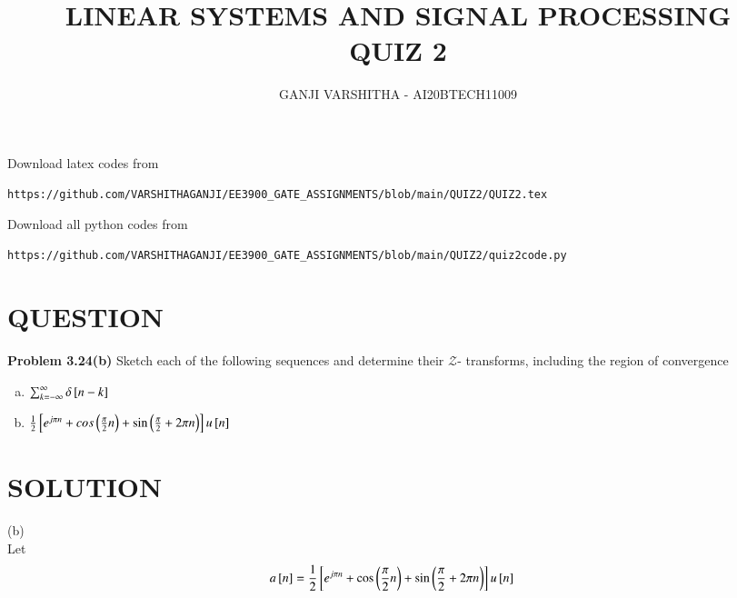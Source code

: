 \documentclass[journal,12pt,twocolumn]{IEEEtran}
\begin{document}
\let\vec\mathbf
\renewcommand{\thefigure}{\theproblem}
\def\putbox#1#2#3{\makebox[0in][l]{\makebox[#1][l]{}\raisebox{\baselineskip}[0in][0in]{\raisebox{#2}[0in][0in]{#3}}}}
     \def\rightbox#1{\makebox[0in][r]{#1}}
     \def\centbox#1{\makebox[0in]{#1}}
     \def\topbox#1{\raisebox{-\baselineskip}[0in][0in]{#1}}
     \def\midbox#1{\raisebox{-0.5\baselineskip}[0in][0in]{#1}}
\vspace{3cm}
\title{\textbf{LINEAR SYSTEMS AND SIGNAL PROCESSING \\ QUIZ 2}}
\author{GANJI VARSHITHA - AI20BTECH11009}
\maketitle
\newpage
\bigskip
\renewcommand{\thefigure}{\arabic{figure}}
\renewcommand{\thetable}{\arabic{table}}
Download latex codes from 
%
\begin{lstlisting}
https://github.com/VARSHITHAGANJI/EE3900_GATE_ASSIGNMENTS/blob/main/QUIZ2/QUIZ2.tex
\end{lstlisting}
Download all python codes from
\begin{lstlisting}
https://github.com/VARSHITHAGANJI/EE3900_GATE_ASSIGNMENTS/blob/main/QUIZ2/quiz2code.py
\end{lstlisting}
\section*{QUESTION}
\textbf{Problem 3.24(b)}
Sketch each of the following sequences and determine their $\mathcal{Z}$- transforms, including the region of convergence
\begin{enumerate}[(a)]
\item $\sum_{k=-\infty}^{\infty} \delta{}\left[n-k\right]$
\item $\frac{1}{2}{}\left[e^{j\pi n} + cos\left(\frac{\pi}{2} n\right) + \sin\left(\frac{\pi}{2}+2 \pi n\right)\right]u{}\left[n\right]$

\end{enumerate}
\section*{SOLUTION}
(b)\\
Let 
\begin{align}
\label{eq:1}
a{}\left[n\right]={}& \frac{1}{2}{}\left[e^{j\pi n} + \cos\left(\frac{\pi}{2} n\right) + \sin\left(\frac{\pi}{2}+2 \pi n\right)\right]u{}\left[n\right]
\end{align}
\end{document}
